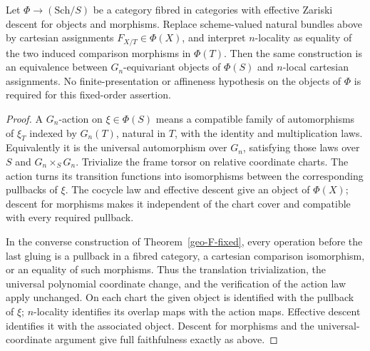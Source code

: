 \begin{corollary}
\label{geo-F-categorical}
Let $\Phi\to(\mathrm{Sch}/S)$ be a category fibred in categories with
effective Zariski descent for objects and morphisms. Replace scheme-valued
natural bundles above by cartesian assignments $F_{X/T}\in\Phi(X)$, and
interpret $n$-locality as equality of the two induced comparison morphisms
in $\Phi(T)$. Then the same construction is an equivalence between
$G_n$-equivariant objects of $\Phi(S)$ and $n$-local cartesian assignments.
No finite-presentation or affineness hypothesis on the objects of $\Phi$
is required for this fixed-order assertion.
\end{corollary}
\begin{proof}
A $G_n$-action on $\xi\in\Phi(S)$ means a compatible family of
automorphisms of $\xi_T$ indexed by $G_n(T)$, natural in $T$, with the
identity and multiplication laws. Equivalently it is the universal
automorphism over $G_n$, satisfying those laws over $S$ and $G_n\times_SG_n$.
Trivialize the frame torsor on relative coordinate charts. The action turns
its transition functions into isomorphisms between the corresponding
pullbacks of $\xi$. The cocycle law and effective descent give an object
of $\Phi(X)$; descent for morphisms makes it independent of the chart
cover and compatible with every required pullback.

In the converse construction of Theorem~\ref{geo-F-fixed}, every operation
before the last gluing is a pullback in a fibred category, a cartesian
comparison isomorphism, or an equality of such morphisms. Thus the
translation trivialization, the universal polynomial coordinate change,
and the verification of the action law apply unchanged. On each chart the
given object is identified with the pullback of $\xi$; $n$-locality
identifies its overlap maps with the action maps. Effective descent
identifies it with the associated object. Descent for morphisms and the
universal-coordinate argument give full faithfulness exactly as above.
\end{proof}

